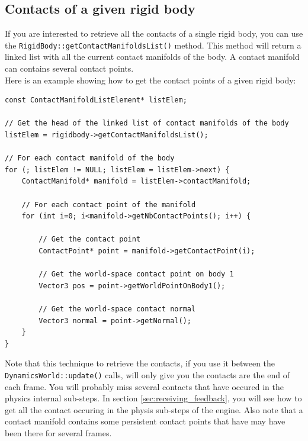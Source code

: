 \documentclass[a4paper,12pt]{article}
\begin{document}
    \subsection{Contacts of a given rigid body}

    If you are interested to retrieve all the contacts of a single rigid body, you can use the \texttt{RigidBody::getContactManifoldsList()} method. This method will
    return a linked list with all the current contact manifolds of the body. A contact manifold can contains several contact points. \\

    Here is an example showing how to get the contact points of a given rigid body: \\

    \begin{lstlisting}
const ContactManifoldListElement* listElem;

// Get the head of the linked list of contact manifolds of the body
listElem = rigidbody->getContactManifoldsList();

// For each contact manifold of the body
for (; listElem != NULL; listElem = listElem->next) {
    ContactManifold* manifold = listElem->contactManifold;

    // For each contact point of the manifold
    for (int i=0; i<manifold->getNbContactPoints(); i++) {

        // Get the contact point
        ContactPoint* point = manifold->getContactPoint(i);

        // Get the world-space contact point on body 1
        Vector3 pos = point->getWorldPointOnBody1();

        // Get the world-space contact normal
        Vector3 normal = point->getNormal();
    }
}
    \end{lstlisting}

     \vspace{0.6cm}

    Note that this technique to retrieve the contacts, if you use it between the \texttt{DynamicsWorld::update()} calls, will only give you the contacts are the end of
    each frame. You will probably miss several contacts that have occured in the physics internal sub-steps. In section \ref{sec:receiving_feedback}, you will
    see how to get all the contact occuring in the physis sub-steps of the engine. Also note that a contact manifold contains some persistent contact points that
    have may have been there for several frames.
\end{document}
